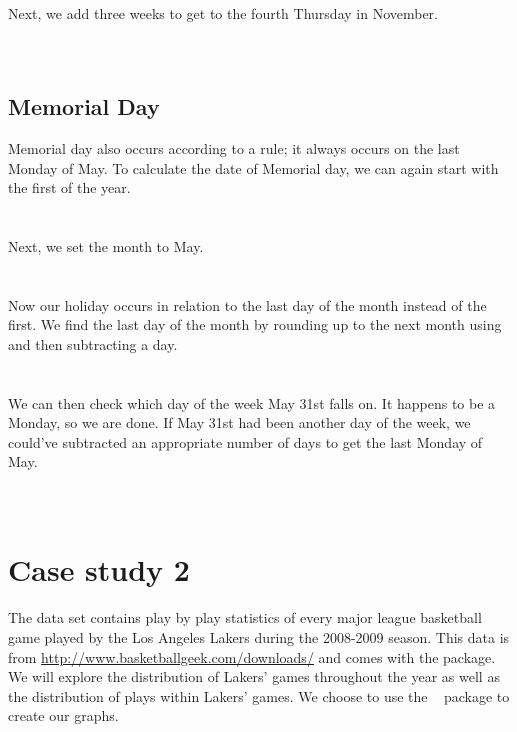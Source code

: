 \documentclass[article]{jss}
\begin{document}
Next, we add three weeks to get to the fourth Thursday in November.\\

\\
\\

\subsection{Memorial Day}
Memorial day also occurs according to a rule; it always occurs on the last Monday of May. To calculate the date of Memorial day, we can again start with the first of the year.\\

\\
\\

Next, we set the month to May.\\

\\
\\

Now our holiday occurs in relation to the last day of the month instead of the first. We find the last day of the month by rounding up to the next month using  and then subtracting a day.\\

\\
\\

We can then check which day of the week May 31st falls on. It happens to be a Monday, so we are done. If May 31st had been another day of the week, we could've subtracted an appropriate number of days to get the last Monday of May.\\

\\
\\


\section{Case study 2}
The  data set contains play by play statistics of every major league basketball game played by the Los Angeles Lakers during the 2008-2009 season. This data is from \url{http://www.basketballgeek.com/downloads/} \citep{bball} and comes with the  package. We will explore the distribution of Lakers' games throughout the year as well as the distribution of plays within Lakers' games. We choose to use the  ~\citep{ggplot2} package to create our graphs.\\
\end{document}
